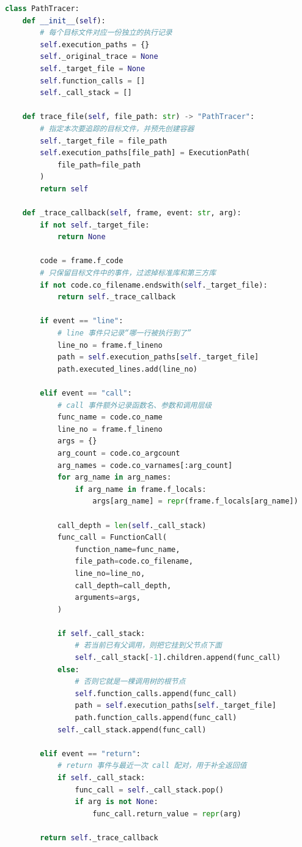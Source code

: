 \begin{lstlisting}[language=Python, caption={运行时追踪器的核心回调逻辑}]
class PathTracer:
    def __init__(self):
        # 每个目标文件对应一份独立的执行记录
        self.execution_paths = {}
        self._original_trace = None
        self._target_file = None
        self.function_calls = []
        self._call_stack = []

    def trace_file(self, file_path: str) -> "PathTracer":
        # 指定本次要追踪的目标文件，并预先创建容器
        self._target_file = file_path
        self.execution_paths[file_path] = ExecutionPath(
            file_path=file_path
        )
        return self

    def _trace_callback(self, frame, event: str, arg):
        if not self._target_file:
            return None

        code = frame.f_code
        # 只保留目标文件中的事件，过滤掉标准库和第三方库
        if not code.co_filename.endswith(self._target_file):
            return self._trace_callback

        if event == "line":
            # line 事件只记录“哪一行被执行到了”
            line_no = frame.f_lineno
            path = self.execution_paths[self._target_file]
            path.executed_lines.add(line_no)

        elif event == "call":
            # call 事件额外记录函数名、参数和调用层级
            func_name = code.co_name
            line_no = frame.f_lineno
            args = {}
            arg_count = code.co_argcount
            arg_names = code.co_varnames[:arg_count]
            for arg_name in arg_names:
                if arg_name in frame.f_locals:
                    args[arg_name] = repr(frame.f_locals[arg_name])

            call_depth = len(self._call_stack)
            func_call = FunctionCall(
                function_name=func_name,
                file_path=code.co_filename,
                line_no=line_no,
                call_depth=call_depth,
                arguments=args,
            )

            if self._call_stack:
                # 若当前已有父调用，则把它挂到父节点下面
                self._call_stack[-1].children.append(func_call)
            else:
                # 否则它就是一棵调用树的根节点
                self.function_calls.append(func_call)
                path = self.execution_paths[self._target_file]
                path.function_calls.append(func_call)
            self._call_stack.append(func_call)

        elif event == "return":
            # return 事件与最近一次 call 配对，用于补全返回值
            if self._call_stack:
                func_call = self._call_stack.pop()
                if arg is not None:
                    func_call.return_value = repr(arg)

        return self._trace_callback
\end{lstlisting}

